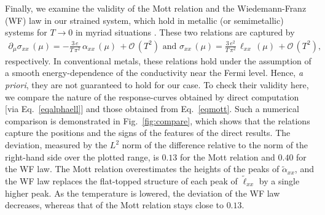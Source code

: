 \documentclass[aps,prb, onecolumn, nofootinbib, citeautoscript,10pt]{revtex4-2}
\newcommand{\red}[1]{{\color{red}#1}}
\begin{document}
Finally, we examine the validity of the Mott relation and the Wiedemann\red{-}Franz (WF) law in our strained system, which hold in metallic (or semimetallic) systems for $T  \rightarrow  0 $ in myriad situations \cite{ips-ruiz, ips-rsw-ph, ips-mwsm-floquet}. 
These two relations are captured by
\begin{align}
\label{eqmott}
\partial_{\mu} \sigma_{xx}\,(\mu)
= - \frac{3 \, e}{T \, \pi^{2}}\, \alpha_{xx} \, (\mu) \,
+ \mathcal{O}\,\left(T^2\right) \text{ and }
\sigma_{xx}\,(\mu)
= \frac{3 \, e^{2}}{T \, \pi^{2}}\, \ell_{xx}\,(\mu)\,
+ \mathcal{O}\,\left(T^2\right),
\end{align}
respectively.
In conventional metals, these relations hold under the assumption of a smooth energy-dependence of the conductivity near the Fermi level. 
Hence, \textit{a priori}, they are not guaranteed to hold for our case. To check their validity here, we compare the nature of the response-curves obtained by direct computation [via Eq.~\eqref{eqalphaell}] and those obtained from Eq.~\eqref{eqmott}. Such a numerical comparison is demonstrated in Fig.~\ref{fig:compare}, \red{which shows that the relations capture the positions and the signs of the features of the direct results. The deviation, measured by the $L^2$ norm of the difference relative to the norm of the right-hand side over the plotted range, is $0.13$ for the Mott relation and $0.40$ for the WF law. The Mott relation overestimates the heights of the peaks of $\tilde\alpha_{xx}$, and the WF law replaces the flat-topped structure of each peak of $\tilde\ell_{xx}$ by a single higher peak. As the temperature is lowered, the deviation of the WF law decreases, whereas that of the Mott relation stays close to $0.13$.} 
\end{document}
